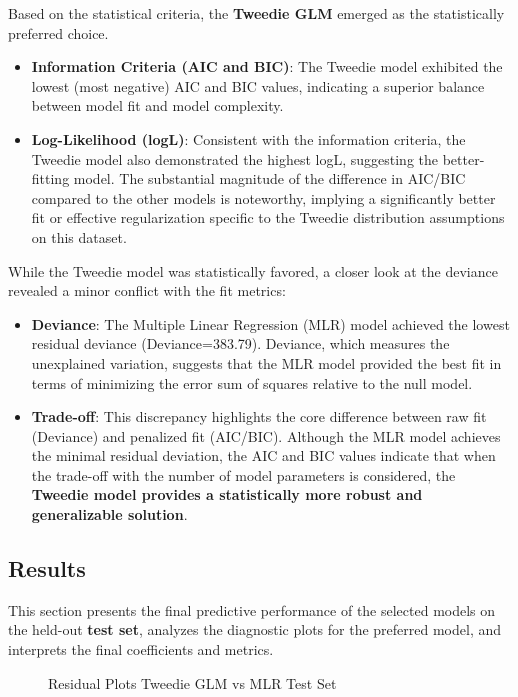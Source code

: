 \documentclass[conference]{IEEEtran}
\begin{document}
Based on the statistical criteria, the \textbf{Tweedie GLM} emerged as the statistically preferred choice.
\begin{itemize}
	\item \textbf{Information Criteria (AIC and BIC)}: The Tweedie model exhibited the lowest (most negative) AIC and BIC values, indicating a superior balance between model fit and model complexity.
	\item \textbf{Log-Likelihood (logL)}: Consistent with the information criteria, the Tweedie model also demonstrated the highest logL, suggesting the better-fitting model. The substantial magnitude of the difference in AIC/BIC compared to the other models is noteworthy, implying a significantly better fit or effective regularization specific to the Tweedie distribution assumptions on this dataset.
\end{itemize}

While the Tweedie model was statistically favored, a closer look at the deviance revealed a minor conflict with the fit metrics:

\begin{itemize}
	\item \textbf{Deviance}: The Multiple Linear Regression (MLR) model achieved the lowest residual deviance (Deviance=383.79). Deviance, which measures the unexplained variation, suggests that the MLR model provided the best fit in terms of minimizing the error sum of squares relative to the null model.
	\item \textbf{Trade-off}: This discrepancy highlights the core difference between raw fit (Deviance) and penalized fit (AIC/BIC). Although the MLR model achieves the minimal residual deviation, the AIC and BIC values indicate that when the trade-off with the number of model parameters is considered, the \textbf{Tweedie model provides a statistically more robust and generalizable solution}.
\end{itemize}

\subsection{\textbf{Results}}
This section presents the final predictive performance of the selected models on the held-out \textbf{test set}, analyzes the diagnostic plots for the preferred model, and interprets the final coefficients and metrics.
\begin{figure}[htbp]
	\centerline{}
	\caption{Residual Plots Tweedie GLM vs MLR Test Set}
	\label{test_residual_plot}
\end{figure}
\end{document}

